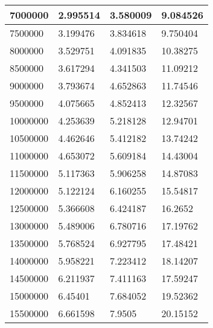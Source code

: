 \begin{table}[]
\begin{tabular}{ll|l|l|}
\multicolumn{1}{|l|}{7000000}        & 2.995514       & 3.580009           & 9.084526           \\ \hline
\multicolumn{1}{|l|}{7500000}        & 3.199476       & 3.834618           & 9.750404           \\ \hline
\multicolumn{1}{|l|}{8000000}        & 3.529751       & 4.091835           & 10.38275           \\ \hline
\multicolumn{1}{|l|}{8500000}        & 3.617294       & 4.341503           & 11.09212           \\ \hline
\multicolumn{1}{|l|}{9000000}        & 3.793674       & 4.652863           & 11.74546           \\ \hline
\multicolumn{1}{|l|}{9500000}        & 4.075665       & 4.852413           & 12.32567           \\ \hline
\multicolumn{1}{|l|}{10000000}       & 4.253639       & 5.218128           & 12.94701           \\ \hline
\multicolumn{1}{|l|}{10500000}       & 4.462646       & 5.412182           & 13.74242           \\ \hline
\multicolumn{1}{|l|}{11000000}       & 4.653072       & 5.609184           & 14.43004           \\ \hline
\multicolumn{1}{|l|}{11500000}       & 5.117363       & 5.906258           & 14.87083           \\ \hline
\multicolumn{1}{|l|}{12000000}       & 5.122124       & 6.160255           & 15.54817           \\ \hline
\multicolumn{1}{|l|}{12500000}       & 5.366608       & 6.424187           & 16.2652            \\ \hline
\multicolumn{1}{|l|}{13000000}       & 5.489006       & 6.780716           & 17.19762           \\ \hline
\multicolumn{1}{|l|}{13500000}       & 5.768524       & 6.927795           & 17.48421           \\ \hline
\multicolumn{1}{|l|}{14000000}       & 5.958221       & 7.223412           & 18.14207           \\ \hline
\multicolumn{1}{|l|}{14500000}       & 6.211937       & 7.411163           & 17.59247           \\ \hline
\multicolumn{1}{|l|}{15000000}       & 6.45401        & 7.684052           & 19.52362           \\ \hline
\multicolumn{1}{|l|}{15500000}       & 6.661598       & 7.9505             & 20.15152           \\ \hline

\end{tabular}
\end{table}
